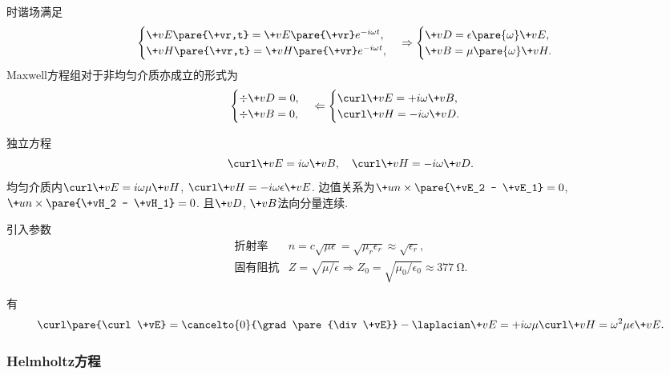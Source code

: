 \documentclass[hidelinks]{ctexart}
\begin{document}
时谐场满足
\[ \begin{cases}
    \+vE\pare{\+vr,t} = \+vE\pare{\+vr}e^{-i\omega t}, \\
    \+vH\pare{\+vr,t} = \+vH\pare{\+vr}e^{-i\omega t},
\end{cases} \Rightarrow \begin{cases}
    \+vD = \epsilon\pare{\omega} \+vE, \\
    \+vB = \mu\pare{\omega} \+vH.
\end{cases} \]
Maxwell方程组对于非均匀介质亦成立的形式为
\[ \begin{cases}
    \div \+vD = 0, \\
    \div \+vB = 0,
\end{cases} \Leftarrow \begin{cases}
    \curl \+vE = +i\omega \+vB, \\
    \curl \+vH = -i\omega \+vD.
\end{cases} \]
\begin{cenum}
    \item 独立方程
    \[ \curl \+vE = i\omega \+vB,\quad \curl \+vH = -i\omega \+vD. \]
    均匀介质内$\curl \+vE = i\omega \mu \+vH$, $\curl \+vH = -i\omega \epsilon \+vE$. 边值关系为$\+un\times \pare{\+vE_2 - \+vE_1} = 0$, $\+un\times \pare{\+vH_2 - \+vH_1} = 0$. 且$\+vD$, $\+vB$法向分量连续.
    \item 引入参数
    \[ \begin{array}{ll}
        \text{折射率} & n=c\sqrt{\mu\epsilon} = \sqrt{\mu_r \epsilon_r} \approx \sqrt{\epsilon_r}, \\
        \text{固有阻抗} & Z = \sqrt{\mu/\epsilon} \Rightarrow Z_0 = \sqrt{\mu_0/\epsilon_0} \approx \SI{377}{\ohm}.
    \end{array} \]
\end{cenum}
有
\[ \curl\pare{\curl \+vE} = \cancelto{0}{\grad\pare{\div \+vE}} - \laplacian \+vE = +i\omega \mu \curl \+vH = \omega^2 \mu\epsilon \+vE. \]


\subsubsection{Helmholtz方程} %
\label{ssub:helmholtz方程}
\end{document}
